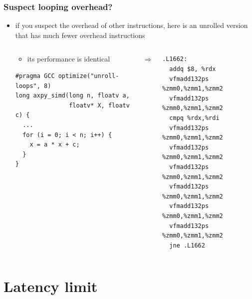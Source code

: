 \documentclass[12pt,dvipdfmx]{beamer}
\begin{document}
\begin{frame}[fragile]
\frametitle{Suspect looping overhead?}
\begin{itemize}
\item if you suspect the overhead of other instructions,
  here is an unrolled version that
  has much fewer overhead instructions
\begin{columns}
\begin{column}{0.51\textwidth}
  \begin{itemize}
  \item its performance is identical
  \end{itemize}

\begin{lstlisting}
#pragma GCC optimize("unroll-loops", 8)
long axpy_simd(long n, floatv a,
               floatv* X, floatv c) {
  ...
  for (i = 0; i < n; i++) {
    x = a * x + c;
  }
}
\end{lstlisting}
\end{column}

\begin{column}{0.05\textwidth}
$\Rightarrow$
\end{column}

\begin{column}{0.40\textwidth}
{\small
\begin{lstlisting}
.L1662:
  addq $8, %rdx
  vfmadd132ps %zmm0,%zmm1,%zmm2
  vfmadd132ps %zmm0,%zmm1,%zmm2
  cmpq %rdx,%rdi
  vfmadd132ps %zmm0,%zmm1,%zmm2
  vfmadd132ps %zmm0,%zmm1,%zmm2
  vfmadd132ps %zmm0,%zmm1,%zmm2
  vfmadd132ps %zmm0,%zmm1,%zmm2
  vfmadd132ps %zmm0,%zmm1,%zmm2
  vfmadd132ps %zmm0,%zmm1,%zmm2
  jne .L1662
\end{lstlisting}} %
\end{column}
\end{columns}
\end{itemize}
\end{frame}
\fi

\section{Latency limit}
\end{document}
